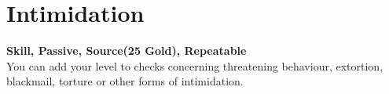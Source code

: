 \section{Intimidation}\label{sec:intimidation}
\textbf{Skill, Passive, Source(25 Gold), Repeatable}\\
You can add your level to checks concerning threatening behaviour, extortion, blackmail, torture or other forms of intimidation.